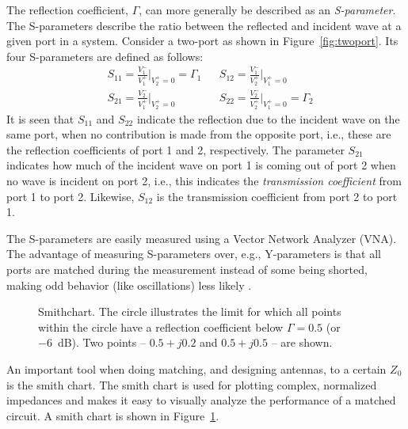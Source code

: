 The reflection coefficient, $\Gamma$, can more generally be described as an \emph{S-parameter}. The S-parameters describe the ratio between the reflected and incident wave at a given port in a system. Consider a two-port as shown in Figure~\ref{fig:twoport}. Its four S-parameters are defined as follows:
\begin{align*}
    &S_{11} = \frac{V_1^-}{V_1^+} \Bigg|_{V_2^+=0} = \Gamma_1
    &&S_{12} = \frac{V_1^-}{V_2^+} \Bigg|_{V_1^+=0} \\
    &S_{21} = \frac{V_2^-}{V_1^+} \Bigg|_{V_2^+=0}
    &&S_{22} = \frac{V_2^-}{V_2^+} \Bigg|_{V_1^+=0} = \Gamma_2
\end{align*}
It is seen that $S_{11}$ and $S_{22}$ indicate the reflection due to the incident wave on the same port, when no contribution is made from the opposite port, i.e., these are the reflection coefficients of port 1 and 2, respectively. The parameter $S_{21}$ indicates how much of the incident wave on port 1 is coming out of port 2 when no wave is incident on port 2, i.e., this indicates the \emph{transmission coefficient} from port 1 to port 2. Likewise, $S_{12}$ is the transmission coefficient from port 2 to port 1.

The S-parameters are easily measured using a Vector Network Analyzer (VNA). The advantage of measuring S-parameters over, e.g., Y-parameters is that all ports are matched during the measurement instead of some being shorted, making odd behavior (like oscillations) less likely \cite{Bowick2007}.

\begin{figure}[htbp]
    \centering
    \caption{Smithchart. The circle illustrates the limit for which all points within the circle have a reflection coefficient below $\Gamma=0.5$ (or \SI{-6}{dB}). Two points -- $0.5+j0.2$ and $0.5+j0.5$ -- are shown.}
    \label{fig:smithchart}
\end{figure}
An important tool when doing matching, and designing antennas, to a certain $Z_0$ is the smith chart. The smith chart is used for plotting complex, normalized impedances and makes it easy to visually analyze the performance of a matched circuit. A smith chart is shown in Figure~\ref{fig:smithchart}.

